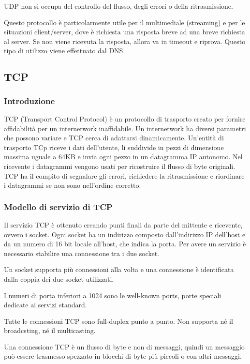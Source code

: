 UDP non si occupa del controllo del flusso, degli errori o della ritrasmissione.

Questo protocollo è particolarmente utile per il multimediale (streaming) e per le situazioni client/server,
dove è richiesta una risposta breve ad una breve richiesta al server.
Se non viene ricevuta la risposta, allora va in timeout e riprova.
Questo tipo di utilizzo viene effettuato dal DNS.

\subsection{TCP}

\subsubsection{Introduzione}
TCP (Transport Control Protocol) è un protocollo di trasporto creato per fornire affidabilità per un internetwork inaffidabile.
Un internetwork ha diversi parametri che possono variare e TCP cerca di adattarsi dinamicamente.
Un'entità di trasporto TCp riceve i dati dell'utente, li suddivide in pezzi di dimensione massima uguale a 64KB e invia ogni pezzo in un datagramma 
IP autonomo.
Nel ricevente i datagrammi vengono usati per ricostruire il flusso di byte originali. 
TCP ha il compito di segnalare gli errori, richiedere la ritrasmissione e riordinare i datagrammi se non sono nell'ordine corretto.

\subsubsection{Modello di servizio di TCP}
Il servizio TCP è ottenuto creando punti finali da parte del mittente e ricevente, ovvero i socket.
Ogni socket ha un indirizzo composto dall'indirizzo IP dell'host e da un numero di 16 bit locale all'host, che indica la porta.
Per avere un servizio è necessario stabilire una connessione tra i due socket.

Un socket supporta più connessioni alla volta e una connessione è identificata dalla coppia dei due socket utilizzati.

I numeri di porta inferiori a 1024 sono le well-known ports, porte speciali dedicate ai servizi standard.

Tutte le connessioni TCP sono full-duplex punto a punto. Non supporta né il broadcsting, né il multicasting.

Una connessione TCP è un flusso di byte e non di messaggi, quindi un messaggio può essere trasmesso spezzato in blocchi di byte più piccoli o con altri messaggi. 

